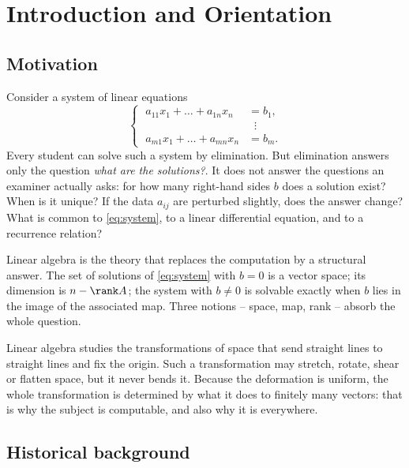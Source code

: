 \chapter{Introduction and Orientation}
\label{ch:introduction}

\section{Motivation}

Consider a system of linear equations
\begin{equation}\label{eq:system}
  \left\{\;\begin{aligned}
    a_{11}x_1+\dots+a_{1n}x_n &= b_1,\\
                              &\;\;\vdots\\
    a_{m1}x_1+\dots+a_{mn}x_n &= b_m.
  \end{aligned}\right.
\end{equation}
Every student can solve such a system by elimination. But elimination answers
only the question \emph{what are the solutions?}. It does not answer the
questions an examiner actually asks: for how many right-hand sides $b$ does a
solution exist? When is it unique? If the data $a_{ij}$ are perturbed slightly,
does the answer change? What is common to \eqref{eq:system}, to a linear
differential equation, and to a recurrence relation?

Linear algebra is the theory that replaces the computation by a structural
answer. The set of solutions of \eqref{eq:system} with $b=0$ is a vector space;
its dimension is $n-\rank A$; the system with $b\neq0$ is solvable exactly when
$b$ lies in the image of the associated map. Three notions -- space, map, rank --
absorb the whole question.

\begin{intuition}
Linear algebra studies the transformations of space that send straight lines to
straight lines and fix the origin. Such a transformation may stretch, rotate,
shear or flatten space, but it never bends it. Because the deformation is
uniform, the whole transformation is determined by what it does to finitely many
vectors: that is why the subject is computable, and also why it is everywhere.
\end{intuition}

\section{Historical background}

